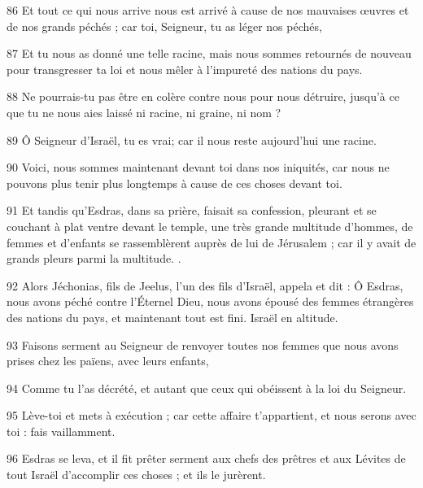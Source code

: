 \par 86 Et tout ce qui nous arrive nous est arrivé à cause de nos mauvaises œuvres et de nos grands péchés ; car toi, Seigneur, tu as léger nos péchés,
\par 87 Et tu nous as donné une telle racine, mais nous sommes retournés de nouveau pour transgresser ta loi et nous mêler à l'impureté des nations du pays.
\par 88 Ne pourrais-tu pas être en colère contre nous pour nous détruire, jusqu'à ce que tu ne nous aies laissé ni racine, ni graine, ni nom ?
\par 89 Ô Seigneur d'Israël, tu es vrai; car il nous reste aujourd'hui une racine.
\par 90 Voici, nous sommes maintenant devant toi dans nos iniquités, car nous ne pouvons plus tenir plus longtemps à cause de ces choses devant toi.
\par 91 Et tandis qu'Esdras, dans sa prière, faisait sa confession, pleurant et se couchant à plat ventre devant le temple, une très grande multitude d'hommes, de femmes et d'enfants se rassemblèrent auprès de lui de Jérusalem ; car il y avait de grands pleurs parmi la multitude. .
\par 92 Alors Jéchonias, fils de Jeelus, l'un des fils d'Israël, appela et dit : Ô Esdras, nous avons péché contre l'Éternel Dieu, nous avons épousé des femmes étrangères des nations du pays, et maintenant tout est fini. Israël en altitude.
\par 93 Faisons serment au Seigneur de renvoyer toutes nos femmes que nous avons prises chez les païens, avec leurs enfants,
\par 94 Comme tu l'as décrété, et autant que ceux qui obéissent à la loi du Seigneur.
\par 95 Lève-toi et mets à exécution ; car cette affaire t'appartient, et nous serons avec toi : fais vaillamment.
\par 96 Esdras se leva, et il fit prêter serment aux chefs des prêtres et aux Lévites de tout Israël d'accomplir ces choses ; et ils le jurèrent.


